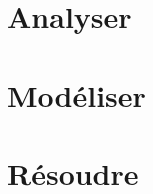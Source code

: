 \documentclass[10pt,fleqn]{book} %
\newcommand{\repStyle}{../../Style}
\begin{document}
\def\xxcompetences{}
\def\xxfigures{}

\graphicspath{{\repStyle/png/}}



\setlength{\columnseprule}{.1pt}

\chapter{Analyser}


\pagestyle{fancy}
\thispagestyle{plain}


\chapter{Modéliser}


\pagestyle{fancy}
\thispagestyle{plain}


\stopcontents

\chapter{Résoudre}
\newpage


\pagestyle{fancy}
\thispagestyle{plain}

\stopcontents

\newpage
\printindex
\end{document}
